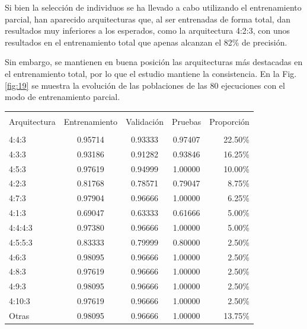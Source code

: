 \documentclass[spanish,a4paper,12pt,twoside]{report}
\begin{document}
  Si bien la selección de individuos se ha llevado a cabo utilizando el entrenamiento parcial, han aparecido arquitecturas que, al ser entrenadas de forma total, dan resultados muy inferiores a los esperados, como la arquitectura 4:2:3, con unos resultados en el entrenamiento total que apenas alcanzan el 82\% de precisión. \par
  Sin embargo, se mantienen en buena posición las arquitecturas más destacadas en el entrenamiento total, por lo que el estudio mantiene la consistencia. En la Fig. \ref{fig:19} se muestra la evolución de las poblaciones de las 80 ejecuciones con el modo de entrenamiento parcial.
  \begin{center}
     \label{table}
    \begin{tabular}{l c c c r}
      \hline \\ [-2ex]
      Arquitectura & Entrenamiento & Validación & Pruebas & Proporción \\ [0.5ex]
      \hline \\ [-1ex]
      4:4:3 & 0.95714 & 0.93333 & 0.97407 & 22.50\% \\
      4:3:3 & 0.93186 & 0.91282 & 0.93846 & 16.25\% \\ 
      4:5:3 & 0.97619 & 0.94999 & 1.00000 & 10.00\% \\
      4:2:3 & 0.81768 & 0.78571 & 0.79047 & 8.75\% \\
      4:7:3 & 0.97904 & 0.96666 & 1.00000 & 6.25\% \\ 
      4:1:3 & 0.69047 & 0.63333 & 0.61666 & 5.00\% \\
      4:4:4:3 & 0.97380 & 0.96666 & 1.00000 & 5.00\% \\
      4:5:5:3 & 0.83333 & 0.79999 & 0.80000 & 2.50\% \\
      4:6:3 & 0.98095 & 0.96666 & 1.00000 & 2.50\% \\
      4:8:3 & 0.97619 & 0.96666 & 1.00000 & 2.50\% \\ 
      4:9:3 & 0.98095 & 0.96666 & 1.00000 & 2.50\% \\
      4:10:3 & 0.97619 & 0.96666 & 1.00000 & 2.50\% \\ 
      Otras & 0.98095 & 0.96666 & 1.00000 & 13.75\% \\ [1ex]
      \hline
    \end{tabular}
  \end{center} \par
\end{document}
